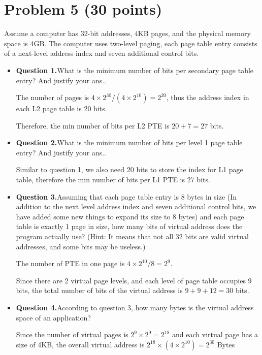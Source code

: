 \documentclass[answers]{exam}
\begin{document}
\section*{Problem 5 (30 points)}
Assume a computer has 32-bit addresses, 4KB pages, and the physical memory space is 4GB. The computer uses two-level paging, each page table entry consists of a next-level address index and seven additional control bits.



\begin{itemize}
  \item \textbf{Question 1.}What is the minimum number of bits per secondary page table entry? And justify your ans..
  

  The number of pages is $4 \times 2^{30} / (4 \times 2^{10}) = 2^{20}$, thus the address index in each L2 page table is 20 bits.

  Therefore, the min number of bits per L2 PTE is $20+7 = 27$ bits.

  \vspace{1.5cm}


  \item \textbf{Question 2.}What is the minimum number of bits per level 1 page table entry? And justify your ans..
  
  Similar to question 1, we also need 20 bits to store the index for L1 page table, therefore the min number of bits per L1 PTE is 27 bits.

  \vspace{1.5cm}


  \item \textbf{Question 3.}Assuming that each page table entry is 8 bytes in size (In addition to the next level address index and seven additional control bits, we have added some new things to expand its size to 8 bytes) and each page table is exactly 1 page in size, how many bits of virtual address does the program actually use?
  (Hint: It means that not all 32 bits are valid virtual addresses, and some bits may be useless.)

  The number of PTE in one page is $4\times 2^{10} / 8 = 2^{9}$. 
  
  Since there are 2 virtual page levels, and each level of page table occupies $9$ bits, the total number of bits of the virtual address is $9 + 9 + 12 = 30$ bits.

  \vspace{1.5cm}

  \item \textbf{Question 4.}According to question 3, how many bytes is the virtual address space of an application?
  

  Since the number of virtual pages is $2^9 \times 2^9 = 2^{18}$ and each virtual page has a size of 4KB, the overall virtual address is $2^{18} \times (4 \times 2^{10}) = 2^{30}$ Bytes


\end{itemize}
\end{document}
